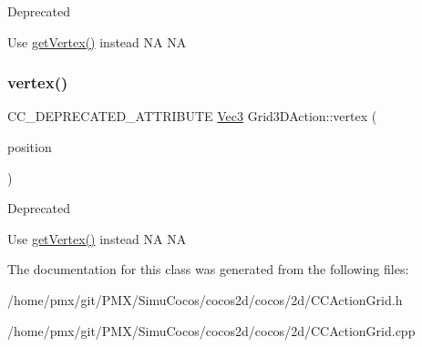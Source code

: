 \begin{DoxyRefDesc}{Deprecated}
\item[\hyperlink{deprecated__deprecated000007}{Deprecated}]Use \hyperlink{classGrid3DAction_a188dfc79a323f07b3aff441bced64201}{get\+Vertex()} instead  NA  NA \end{DoxyRefDesc}
\mbox{\label{classGrid3DAction_a75b5c44d0729a43476dff9ab6e7b281c}} 
\subsubsection{\texorpdfstring{vertex()}{vertex()}\hspace{0.1cm}{\footnotesize\ttfamily [2/2]}}
{\footnotesize\ttfamily C\+C\+\_\+\+D\+E\+P\+R\+E\+C\+A\+T\+E\+D\+\_\+\+A\+T\+T\+R\+I\+B\+U\+TE \hyperlink{classVec3}{Vec3} Grid3\+D\+Action\+::vertex (\begin{DoxyParamCaption}\item[{const \hyperlink{classVec2}{Vec2} \&}]{position }\end{DoxyParamCaption})\hspace{0.3cm}{\ttfamily [inline]}}

\begin{DoxyRefDesc}{Deprecated}
\item[\hyperlink{deprecated__deprecated000237}{Deprecated}]Use \hyperlink{classGrid3DAction_a188dfc79a323f07b3aff441bced64201}{get\+Vertex()} instead  NA  NA \end{DoxyRefDesc}


The documentation for this class was generated from the following files\+:\begin{DoxyCompactItemize}
\item 
/home/pmx/git/\+P\+M\+X/\+Simu\+Cocos/cocos2d/cocos/2d/C\+C\+Action\+Grid.\+h\item 
/home/pmx/git/\+P\+M\+X/\+Simu\+Cocos/cocos2d/cocos/2d/C\+C\+Action\+Grid.\+cpp\end{DoxyCompactItemize}
